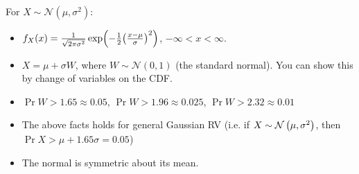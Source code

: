 \begin{note}
    For $X \sim \mathcal{N}(\mu, \sigma^2)$:
    \begin{itemize}
        \item $f_X(x) = \frac{1}{\sqrt{2 \pi \sigma^2}}\exp(-\frac{1}{2}\qty(\frac{x - \mu}{\sigma})^2)$, $-\infty < x < \infty$.
        \item $X = \mu + \sigma W$, where $W \sim \mathcal{N}(0, 1)$ (the standard normal). You can show this by change of variables on the CDF.
        \item $\Pr{W > 1.65} \approx 0.05$, $\Pr{W > 1.96} \approx 0.025$, $\Pr{W > 2.32} \approx 0.01$
        \item The above facts holds for general Gaussian RV (i.e. if $X \sim \mathcal{N}\left( \mu, \sigma^2 \right)$, then $\Pr{X > \mu + 1.65 \sigma} = 0.05$)
        \item The normal is symmetric about its mean.
    \end{itemize}
\end{note}